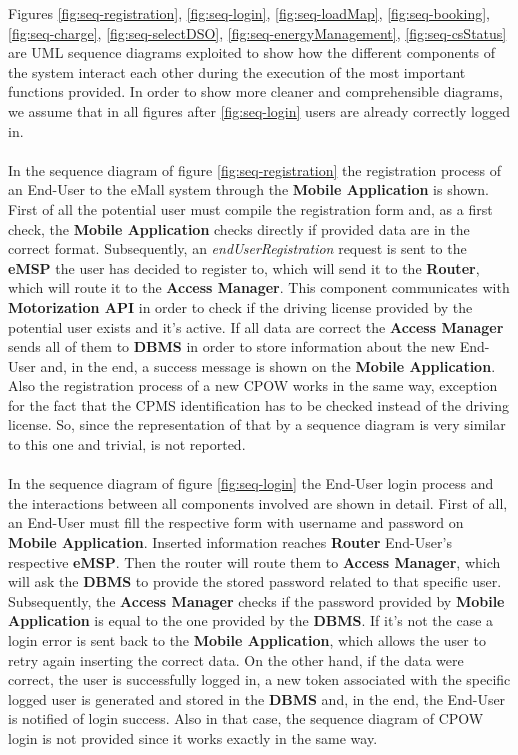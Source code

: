 \documentclass[a4paper]{report}
\begin{document}
Figures \ref{fig:seq-registration}, \ref{fig:seq-login}, \ref{fig:seq-loadMap}, \ref{fig:seq-booking}, \ref{fig:seq-charge}, \ref{fig:seq-selectDSO}, \ref{fig:seq-energyManagement}, \ref{fig:seq-csStatus} are UML sequence diagrams exploited to show how the different components of the system interact each other during the execution of the most important functions provided. In order to show more cleaner and comprehensible diagrams, we assume that in all figures after \ref{fig:seq-login} users are already correctly logged in.
\\\\
In the sequence diagram of figure \ref{fig:seq-registration} the registration process of an End-User to the eMall system through the \textbf{Mobile Application} is shown. First of all the potential user must compile the registration form and, as a first check, the \textbf{Mobile Application} checks directly if provided data are in the correct format. Subsequently, an \textit{endUserRegistration} request is sent to the \textbf{eMSP} the user has decided to register to, which will send it to the \textbf{Router}, which will route it to the \textbf{Access Manager}. This component communicates with \textbf{Motorization API} in order to check if the driving license provided by the potential user exists and it's active. If all data are correct the \textbf{Access Manager} sends all of them to \textbf{DBMS} in order to store information about the new End-User and, in the end, a success message is shown on the \textbf{Mobile Application}. Also the registration process of a new CPOW works in the same way, exception for the fact that the CPMS identification has to be checked instead of the driving license. So, since the representation of that by a sequence diagram is very similar to this one and trivial, is not reported.
\\\\
In the sequence diagram of figure \ref{fig:seq-login} the End-User login process and the interactions between all components involved are shown in detail. First of all, an End-User must fill the respective form with username and password on \textbf{Mobile Application}. Inserted information reaches \textbf{Router} End-User's respective \textbf{eMSP}. Then the router will route them to \textbf{Access Manager}, which will ask the \textbf{DBMS} to provide the stored password related to that specific user. Subsequently, the \textbf{Access Manager} checks if the password provided by \textbf{Mobile Application} is equal to the one provided by the \textbf{DBMS}. If it's not the case a login error is sent back to the \textbf{Mobile Application}, which allows the user to retry again inserting the correct data. On the other hand, if the data were correct, the user is successfully logged in, a new token associated with the specific logged user is generated and stored in the \textbf{DBMS} and, in the end, the End-User is notified of login success. Also in that case, the sequence diagram of CPOW login is not provided since it works exactly in the same way.
\end{document}
